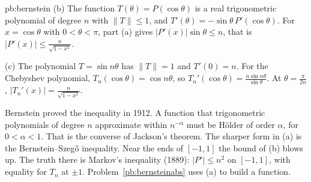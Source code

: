 \begin{solution}{pb:bernstein}
(b) The function $T(\theta)=P(\cos\theta)$ is a real trigonometric polynomial of degree $n$ with $\|T\|\le1$, and $T'(\theta)=-\sin\theta\,P'(\cos\theta)$. For $x=\cos\theta$ with
$0<\theta<\pi$, part (a) gives $|P'(x)|\sin\theta\le n$, that is $|P'(x)|\le\frac n{\sqrt{1-x^2}}$.

(c) The polynomial $T=\sin n\theta$ has $\|T\|=1$ and $T'(0)=n$. For the Chebyshev polynomial, $T_n(\cos\theta)=\cos n\theta$, so $T_n'(\cos\theta)=\frac{n\sin n\theta}{\sin\theta}$. At $\theta=\frac\pi{2n}$,
$|T_n'(x)|=\frac n{\sqrt{1-x^2}}$.

\leads Bernstein proved the inequality in 1912. A function that trigonometric polynomials
of degree $n$ approximate within $n^{-\alpha}$ must be Hölder of order $\alpha$, for $0<\alpha<1$. That is the converse of Jackson's theorem. The sharper form
in (a) is the Bernstein--Szegő inequality. Near the ends of $[-1,1]$ the bound of (b) blows up. The truth there is Markov's
inequality (1889): $|P'|\le n^2$ on $[-1,1]$, with equality for $T_n$ at $\pm1$. Problem~\ref{pb:bernsteinabs} uses (a) to build a function.
\end{solution}

